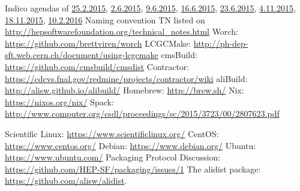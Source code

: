 \documentclass[12pt,a4paper]{article}
\begin{document}
\begin{thebibliography}{9}
 Indico agendas of
\href{https://indico.cern.ch/event/373973/}{25.2.2015},
\href{https://indico.cern.ch/event/398344/}{2.6.2015},
\href{https://indico.cern.ch/event/400272/}{9.6.2015},
\href{https://indico.cern.ch/event/402229/}{16.6.2015},
\href{https://indico.cern.ch/event/403790/}{23.6.2015},
\href{https://indico.cern.ch/event/457365/}{4.11.2015},
\href{https://indico.cern.ch/event/462334/}{18.11.2015},
\href{https://indico.cern.ch/event/484006/}{10.2.2016}
Naming convention TN listed on \url{http://hepsoftwarefoundation.org/technical_notes.html}
 Worch: \url{https://github.com/brettviren/worch}
 LCGCMake: \url{http://ph-dep-sft.web.cern.ch/document/using-lcgcmake}
 cmsBuild: \url{https://github.com/cmsbuild/cmsdist}
 Contractor: \url{https://cdcvs.fnal.gov/redmine/projects/contractor/wiki}
 aliBuild: \url{http://alisw.github.io/alibuild/}
 Homebrew: \url{http://brew.sh/}
 Nix: \url{https://nixos.org/nix/}
 Spack: \url{http://www.computer.org/csdl/proceedings/sc/2015/3723/00/2807623.pdf}

 Scientific Linux: \url{https://www.scientificlinux.org/}
 CentOS: \url{https://www.centos.org/}
 Debian: \url{https://www.debian.org/}
 Ubuntu: \url{https://www.ubuntu.com/}
 Packaging Protocol Discussion:  \url{https://github.com/HEP-SF/packaging/issues/1}
 The alidist package: \url{https://github.com/alisw/alidist}.
\end{thebibliography}
\end{document}
